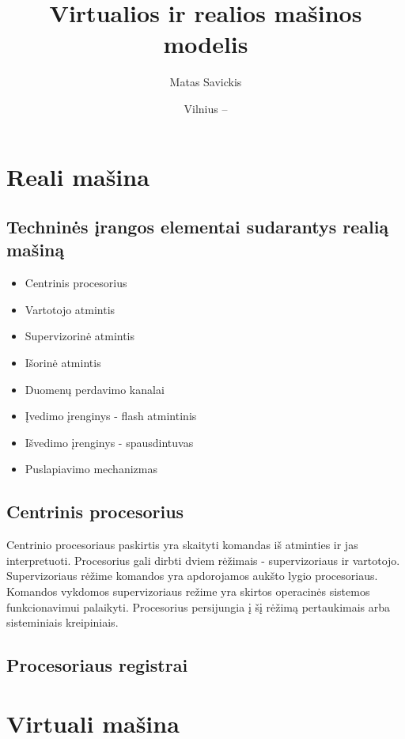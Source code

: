 \documentclass[oneside]{VUMIFPSkursinis}
\title{Virtualios ir realios mašinos modelis}
\author{Matas Savickis}
\date{Vilnius – \the\year}
\begin{document}
\maketitle
\tableofcontents

\section{Reali mašina}
\subsection{Techninės įrangos elementai sudarantys realią mašiną}
\begin{itemize}
	\item{Centrinis procesorius}
	\item{Vartotojo atmintis}
	\item{Supervizorinė atmintis}
	\item{Išorinė atmintis}
	\item{Duomenų perdavimo kanalai}
	\item{Įvedimo įrenginys - flash atmintinis}
	\item{Išvedimo įrenginys - spausdintuvas}
	\item{Puslapiavimo mechanizmas}
\end{itemize}

\subsection{Centrinis procesorius}
	Centrinio procesoriaus paskirtis yra skaityti komandas iš atminties ir jas interpretuoti. Procesorius gali dirbti dviem rėžimais - supervizoriaus ir vartotojo. Supervizoriaus rėžime komandos yra apdorojamos aukšto lygio procesoriaus. Komandos vykdomos supervizoriaus režime yra skirtos operacinės sistemos funkcionavimui palaikyti. Procesorius persijungia į šį rėžimą pertaukimais arba sisteminiais kreipiniais.
\subsection{Procesoriaus registrai}


\section{Virtuali mašina}
\end{document}
